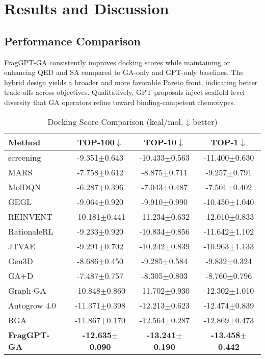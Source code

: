 \documentclass[letterpaper,journal]{IEEEtran}
\begin{document}
\section{Results and Discussion}
\subsection{Performance Comparison}
FragGPT-GA consistently improves docking scores while maintaining or enhancing QED and SA compared to GA-only and GPT-only baselines. The hybrid design yields a broader and more favorable Pareto front, indicating better trade-offs across objectives. Qualitatively, GPT proposals inject scaffold-level diversity that GA operators refine toward binding-competent chemotypes.

\begin{table}[!t]
    \caption{Docking Score Comparison (kcal/mol, ↓ better)}
    \label{tab:docking_scores}
    \centering    
    \small
    \setlength{\tabcolsep}{4pt}
    
    \begin{tabular}{l c c c}
        \hline\hline
        Method & TOP-100$\downarrow$ & TOP-10$\downarrow$ & TOP-1$\downarrow$ \\
        \hline
        screening & -9.351$\pm$0.643 & -10.433$\pm$0.563 & -11.400$\pm$0.630 \\
        MARS & -7.758$\pm$0.612 & -8.875$\pm$0.711 & -9.257$\pm$0.791 \\
        MolDQN & -6.287$\pm$0.396 & -7.043$\pm$0.487 & -7.501$\pm$0.402 \\
        GEGL & -9.064$\pm$0.920 & -9.910$\pm$0.990 & -10.450$\pm$1.040 \\
        REINVENT & -10.181$\pm$0.441 & -11.234$\pm$0.632 & -12.010$\pm$0.833 \\
        RationaleRL & -9.233$\pm$0.920 & -10.834$\pm$0.856 & -11.642$\pm$1.102 \\
        JTVAE & -9.291$\pm$0.702 & -10.242$\pm$0.839 & -10.963$\pm$1.133 \\
        Gen3D & -8.686$\pm$0.450 & -9.285$\pm$0.584 & -9.832$\pm$0.324 \\
        GA+D & -7.487$\pm$0.757 & -8.305$\pm$0.803 & -8.760$\pm$0.796 \\
        Graph-GA & -10.848$\pm$0.860 & -11.702$\pm$0.930 & -12.302$\pm$1.010 \\
        Autogrow 4.0 & -11.371$\pm$0.398 & -12.213$\pm$0.623 & -12.474$\pm$0.839 \\
        RGA  & -11.867$\pm$0.170 & -12.564$\pm$0.287 & -12.869$\pm$0.473 \\             
        \hline
        \textbf{FragGPT-GA} & \textbf{-12.635$\pm$0.090} & \textbf{-13.241$\pm$0.190} & \textbf{-13.458$\pm$0.442} \\           
        \hline\hline
    \end{tabular}
\end{table}
\end{document}

